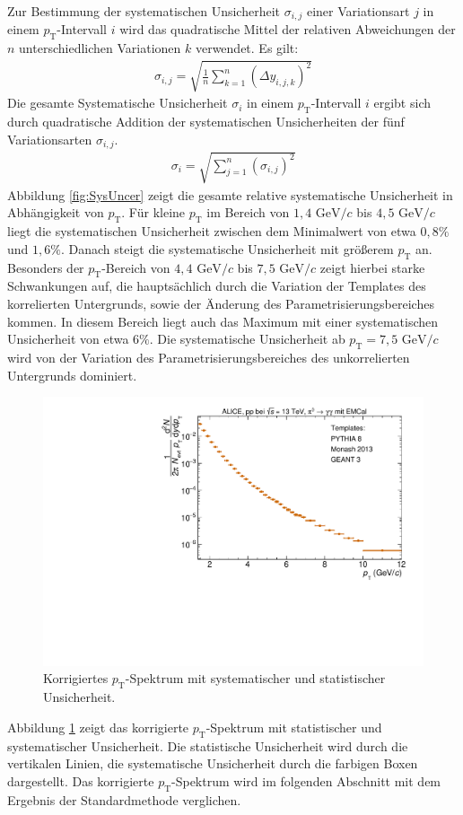 Zur Bestimmung der systematischen Unsicherheit $\sigma_{i,j}$ einer Variationsart $j$ in einem $p_\text{T}$-Intervall $i$ wird das quadratische Mittel der relativen Abweichungen der $n$ unterschiedlichen Variationen $k$ verwendet.
Es gilt:
\begin{align}
\sigma_{i,j} = \sqrt{\frac{1}{n}\sum_{k=1}^{n}\left(\Delta y_{i,j,k}\right)^{2}}
\end{align}
Die gesamte Systematische Unsicherheit $\sigma_{i}$ in einem $p_\text{T}$-Intervall $i$ ergibt sich durch quadratische Addition der systematischen Unsicherheiten der fünf Variationsarten $\sigma_{i,j}$.
\begin{align}
\sigma_{i} = \sqrt{\sum_{j=1}^{n}\left(\sigma_{i,j}\right)^{2}}
\end{align}
Abbildung \ref{fig:SysUncer} zeigt die gesamte relative systematische Unsicherheit in Abhängigkeit von $p_\text{T}$.
Für kleine $p_\text{T}$ im Bereich von $1,4 \text{ GeV}/c$ bis $4,5 \text{ GeV}/c$ liegt die systematischen Unsicherheit zwischen dem Minimalwert von etwa $0,8\%$ und $1,6\%$.
Danach steigt die systematische Unsicherheit mit größerem $p_\text{T}$ an.
Besonders der $p_\text{T}$-Bereich von $4,4 \text{ GeV}/c$ bis $7,5 \text{ GeV}/c$ zeigt hierbei starke Schwankungen auf, die hauptsächlich durch die Variation der Templates des korrelierten Untergrunds, sowie der Änderung des Parametrisierungsbereiches kommen.
In diesem Bereich liegt auch das Maximum mit einer systematischen Unsicherheit von etwa $6\%$.
Die systematische Unsicherheit ab $p_\text{T} = 7,5 \text{ GeV}/c$ wird von der Variation des Parametrisierungsbereiches des unkorrelierten Untergrunds dominiert.
\begin{figure}[t!]
\centering
\includegraphics[width=.65\linewidth]{KorrigierterYield_Data_2016.pdf}
\caption{Korrigiertes $p_\text{T}$-Spektrum mit systematischer und statistischer Unsicherheit.}
\label{fig:KorrYield}
\end{figure}
\newline
Abbildung \ref{fig:KorrYield} zeigt das korrigierte $p_\text{T}$-Spektrum mit statistischer und systematischer Unsicherheit.
Die statistische Unsicherheit wird durch die vertikalen Linien, die systematische Unsicherheit durch die farbigen Boxen dargestellt.
\newline
Das korrigierte $p_\text{T}$-Spektrum wird im folgenden Abschnitt mit dem Ergebnis der Standardmethode verglichen.